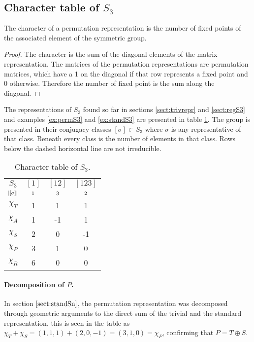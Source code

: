 \subsection{Character table of $S_3$}

\begin{theorem}
	The character of a permutation representation is the number of fixed points of the associated element of the symmetric group.
\end{theorem}
\begin{proof}
	The character is the sum of the diagonal elements of the matrix representation. The matrices of the permutation representations are permutation matrices, which have a 1 on the diagonal if that row represents a fixed point and 0 otherwise. Therefore the number of fixed point is the sum along the diagonal.
\end{proof}

The representations of $S_3$ found so far in sections \ref{sect:trivrepr} and \ref{sect:regS3} and examples \ref{ex:permS3} and \ref{ex:standS3} are presented in table \ref{table:charS3}. The group is presented in their conjugacy classes $[\sigma] \subset S_3$ where $\sigma$ is any representative of that class. Beneath every class is the number of elements in that class. Rows below the dashed horizontal line are not irreducible.

\begin{table}[hbt!]
	\centering
	\begin{tabular}{c | c c c}
		     $S_3$      & $[1]$   & $[12]$  & $[123]$ \\
		$\scriptstyle|[\sigma]|$ & $\scriptstyle 1$ & $\scriptstyle 3$ & $\scriptstyle 2$ \\ \hline
		   $\chi_T$     & 1       & 1       & 1       \\
		   $\chi_A$     & 1       & -1      & 1       \\
		   $\chi_S$     & 2       & 0       & -1      \\ \hline\hline
		   $\chi_P$     & 3       & 1       & 0       \\
		   $\chi_R$     & 6       & 0       & 0
	\end{tabular}
	\caption{Character table of $S_3$.}
	\label{table:charS3}
\end{table}

\paragraph{Decomposition of $P$.} In section $\ref{sect:standSn}$, the permutation representation was decomposed through geometric arguments to the direct sum of the trivial and the standard representation, this is seen in the table as $\chi_T + \chi_S = (1,1,1) + (2,0,-1) = (3,1,0) = \chi_P$, confirming that $P = T \oplus S$. 

